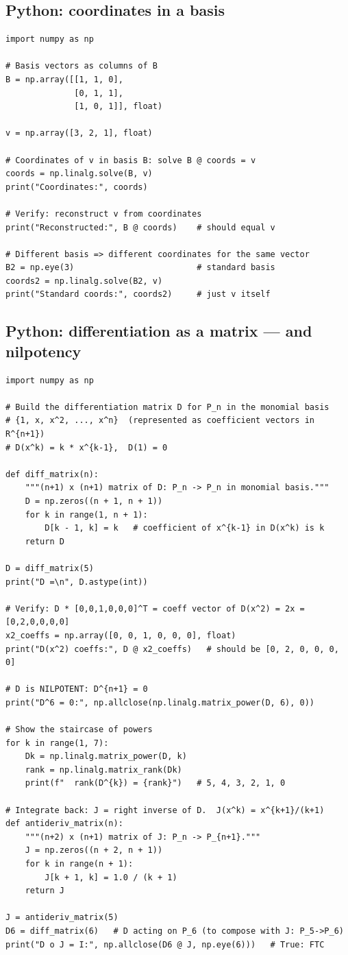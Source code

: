 \documentclass[11pt]{article}
\theoremstyle{definition}
\theoremstyle{plain}
\begin{document}
\subsection{Python: coordinates in a basis}
\begin{lstlisting}
import numpy as np

# Basis vectors as columns of B
B = np.array([[1, 1, 0],
              [0, 1, 1],
              [1, 0, 1]], float)

v = np.array([3, 2, 1], float)

# Coordinates of v in basis B: solve B @ coords = v
coords = np.linalg.solve(B, v)
print("Coordinates:", coords)

# Verify: reconstruct v from coordinates
print("Reconstructed:", B @ coords)    # should equal v

# Different basis => different coordinates for the same vector
B2 = np.eye(3)                         # standard basis
coords2 = np.linalg.solve(B2, v)
print("Standard coords:", coords2)     # just v itself
\end{lstlisting}

\subsection{Python: differentiation as a matrix --- and nilpotency}
\begin{lstlisting}
import numpy as np

# Build the differentiation matrix D for P_n in the monomial basis
# {1, x, x^2, ..., x^n}  (represented as coefficient vectors in R^{n+1})
# D(x^k) = k * x^{k-1},  D(1) = 0

def diff_matrix(n):
    """(n+1) x (n+1) matrix of D: P_n -> P_n in monomial basis."""
    D = np.zeros((n + 1, n + 1))
    for k in range(1, n + 1):
        D[k - 1, k] = k   # coefficient of x^{k-1} in D(x^k) is k
    return D

D = diff_matrix(5)
print("D =\n", D.astype(int))

# Verify: D * [0,0,1,0,0,0]^T = coeff vector of D(x^2) = 2x = [0,2,0,0,0,0]
x2_coeffs = np.array([0, 0, 1, 0, 0, 0], float)
print("D(x^2) coeffs:", D @ x2_coeffs)   # should be [0, 2, 0, 0, 0, 0]

# D is NILPOTENT: D^{n+1} = 0
print("D^6 = 0:", np.allclose(np.linalg.matrix_power(D, 6), 0))

# Show the staircase of powers
for k in range(1, 7):
    Dk = np.linalg.matrix_power(D, k)
    rank = np.linalg.matrix_rank(Dk)
    print(f"  rank(D^{k}) = {rank}")   # 5, 4, 3, 2, 1, 0

# Integrate back: J = right inverse of D.  J(x^k) = x^{k+1}/(k+1)
def antideriv_matrix(n):
    """(n+2) x (n+1) matrix of J: P_n -> P_{n+1}."""
    J = np.zeros((n + 2, n + 1))
    for k in range(n + 1):
        J[k + 1, k] = 1.0 / (k + 1)
    return J

J = antideriv_matrix(5)
D6 = diff_matrix(6)   # D acting on P_6 (to compose with J: P_5->P_6)
print("D o J = I:", np.allclose(D6 @ J, np.eye(6)))   # True: FTC
\end{lstlisting}
\end{document}

